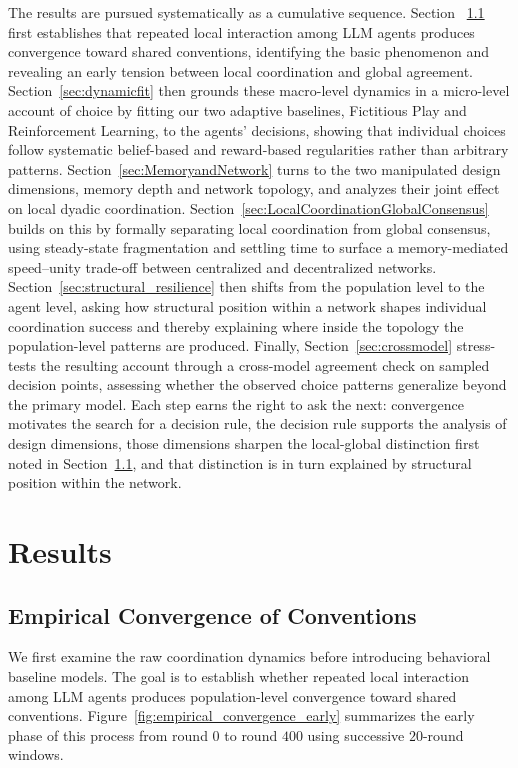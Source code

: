 \documentclass{article}
\begin{document}
The results are pursued systematically as a cumulative sequence. Section ~\ref{sec:EmpiricalConvergence} first establishes that repeated local interaction among LLM agents produces convergence toward shared conventions, identifying the basic phenomenon and revealing an early tension between local coordination and global agreement. Section~\ref{sec:dynamicfit} then grounds these macro-level dynamics in a micro-level account of choice by fitting our two adaptive baselines, Fictitious Play and Reinforcement Learning, to the agents' decisions, showing that individual choices follow systematic belief-based and reward-based regularities rather than arbitrary patterns. Section~\ref{sec:MemoryandNetwork} turns to the two manipulated design dimensions, memory depth and network topology, and analyzes their joint effect on local dyadic coordination. Section~\ref{sec:LocalCoordinationGlobalConsensus} builds on this by formally separating local coordination from global consensus, using steady-state fragmentation and settling time to surface a memory-mediated speed–unity trade-off between centralized and decentralized networks. Section~\ref{sec:structural_resilience} then shifts from the population level to the agent level, asking how structural position within a network shapes individual coordination success and thereby explaining where inside the topology the population-level patterns are produced. Finally, Section~\ref{sec:crossmodel} stress-tests the resulting account through a cross-model agreement check on sampled decision points, assessing whether the observed choice patterns generalize beyond the primary model. Each step earns the right to ask the next: convergence motivates the search for a decision rule, the decision rule supports the analysis of design dimensions, those dimensions sharpen the local-global distinction first noted in Section~\ref{sec:EmpiricalConvergence}, and that distinction is in turn explained by structural position within the network.

\section{Results}

\subsection{Empirical Convergence of Conventions}
\label{sec:EmpiricalConvergence}

We first examine the raw coordination dynamics before introducing behavioral baseline models. The goal is to establish whether repeated local interaction among LLM agents produces population-level convergence toward shared conventions. Figure~\ref{fig:empirical_convergence_early} summarizes the early phase of this process from round $0$ to round $400$ using successive $20$-round windows.
\end{document}
